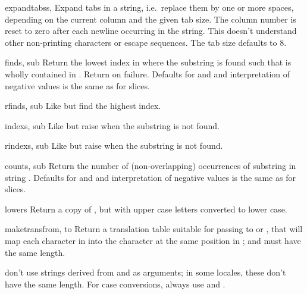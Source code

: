 \begin{funcdesc}{expandtabs}{s, }
  Expand tabs in a string, i.e.\ replace them by one or more spaces,
  depending on the current column and the given tab size.  The column
  number is reset to zero after each newline occurring in the string.
  This doesn't understand other non-printing characters or escape
  sequences.  The tab size defaults to 8.
\end{funcdesc}

\begin{funcdesc}{find}{s, sub}
  Return the lowest index in  where the substring  is
  found such that  is wholly contained in
  .  Return  on failure.
  Defaults for  and  and interpretation of
  negative values is the same as for slices.
\end{funcdesc}

\begin{funcdesc}{rfind}{s, sub}
  Like  but find the highest index.
\end{funcdesc}

\begin{funcdesc}{index}{s, sub}
  Like  but raise  when the
  substring is not found.
\end{funcdesc}

\begin{funcdesc}{rindex}{s, sub}
  Like  but raise  when the
  substring is not found.
\end{funcdesc}

\begin{funcdesc}{count}{s, sub}
  Return the number of (non-overlapping) occurrences of substring
   in string .
  Defaults for  and  and interpretation of
  negative values is the same as for slices.
\end{funcdesc}

\begin{funcdesc}{lower}{s}
  Return a copy of , but with upper case letters converted to
  lower case.
\end{funcdesc}

\begin{funcdesc}{maketrans}{from, to}
  Return a translation table suitable for passing to
   or , that will map
  each character in  into the character at the same position
  in ;  and  must have the same length.

   don't use strings derived from 
  and  as arguments; in some locales, these don't have
  the same length.  For case conversions, always use
   and .
\end{funcdesc}

